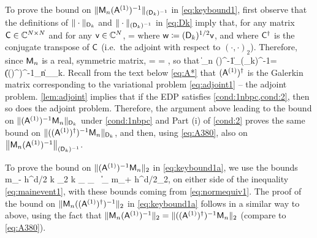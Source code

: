 To prove the bound on $\|\mathsf{M}_n(\mathsf{A}^{(1)})^{-1}\|_{(\mathsf{D}_k)^{-1}}$ in \cref{eq:keybound1}, first observe that the definitions of $\|\cdot\|_{\mathsf{D}_k}$ and $\|\cdot\|_{(\mathsf{D}_k)^{-1}}$ in \cref{eq:Dk} imply that, for any matrix $\mathsf{C} \in \mathbb C^{N\times N}$ and for any $\mathsf{v}\in \mathbb C^N$,
\beq\label{eq:A380-0}
 = 
\eeq
where $\mathsf{w} \coloneqq (\mathsf{D}_k)^{1/2}\mathsf{v}$, and where $\mathsf{C}^\dagger$ is the conjugate transpose of $\mathsf{C}$ (i.e.~the adjoint with respect to $(\cdot,\cdot)_2$).
Therefore, since $\mathsf{M}_n$ is a real, symmetric matrix,
\beqs
{}
=
\frac{\NDk{\mleft(\AmatoI\Mmatn\mright)^\dagger \wvec}}{\NDk{\wvec}}
= 
,
 \eeqs
 so that 
\beq\label{eq:A380} 
 \big\|\Mmat_n (\Amato)^{-1}\big\|_{(\Dmat_k)^{-1}}=\big\|((\Amato)^\dagger)^{-1}\Mmat_n\big\|_{\Dmat_k}.
 \eeq 
Recall from the text below \cref{eq:A*} that $(\mathsf{A}^{(1)})^\dagger$ is the Galerkin matrix corresponding to the variational problem \cref{eq:adjoint1} -- the adjoint problem. \cref{lem:adjoint} implies that if the EDP %
satisfies \cref{cond:1nbpc,cond:2}, then so does the adjoint problem. Therefore, the argument above leading to the bound on $\|(\mathsf{A}^{(1)})^{-1}\mathsf{M}_n\|_{\mathsf{D}_k}$ under \cref{cond:1nbpc} and Part (i) of \cref{cond:2} proves the same bound on $\|((\mathsf{A}^{(1)})^\dagger)^{-1}\mathsf{M}_n\|_{\mathsf{D}_k}$, and then, using \cref{eq:A380}, also on $\big\|\mathsf{M}_n(\mathsf{A}^{(1)})^{-1}\big\|_{(\mathsf{D}_k)^{-1}}$.

To prove the bound on  $\|(\mathsf{A}^{(1)})^{-1}\mathsf{M}_n\|_{2}$ in \cref{eq:keybound1a}, we use the bounds 
\beqs
m_- h^{d/2} k \N{\tbu}_2 \leq k _{\LtD} \leq {}_{\HokD}
\,\tand\,
\big\|\big\|_{\LtD} \leq m_+ h^{d/2}\N{\fvec}_2,
\eeqs
on either side of the inequality \cref{eq:mainevent1}, with these bounds coming from \cref{eq:normequiv1}. The proof of the bound on 
$\|\mathsf{M}_n((\mathsf{A}^{(1)})^\dagger)^{-1}\|_{2}$ in \cref{eq:keybound1a} follows in a similar way to above, using the fact that 
$\|\mathsf{M}_n (\mathsf{A}^{(1)})^{-1}\|_2=\|((\mathsf{A}^{(1)})^\dagger)^{-1}\mathsf{M}_n\|_2$ (compare to \cref{eq:A380}).
%
%
\epf

